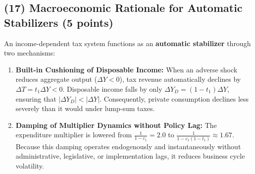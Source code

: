\documentclass[11pt,a4paper]{article}
\begin{document}
\subsection*{(17) Macroeconomic Rationale for Automatic Stabilizers (5 points)}
An income-dependent tax system functions as an \textbf{automatic stabilizer} through two mechanisms:
\begin{enumerate}
    \item \textbf{Built-in Cushioning of Disposable Income:} When an adverse shock reduces aggregate output ($\Delta Y < 0$), tax revenue automatically declines by $\Delta T = t_1 \Delta Y < 0$. Disposable income falls by only $\Delta Y_D = (1 - t_1) \Delta Y$, ensuring that $\vert{}\Delta Y_D\vert{} < \vert{}\Delta Y\vert{}$. Consequently, private consumption declines less severely than it would under lump-sum taxes.
    \item \textbf{Damping of Multiplier Dynamics without Policy Lag:} The expenditure multiplier is lowered from $\frac{1}{1-c_1} = 2.0$ to $\frac{1}{1-c_1(1-t_1)} \approx 1.67$. Because this damping operates endogenously and instantaneously without administrative, legislative, or implementation lags, it reduces business cycle volatility.
\end{enumerate}
\end{document}
